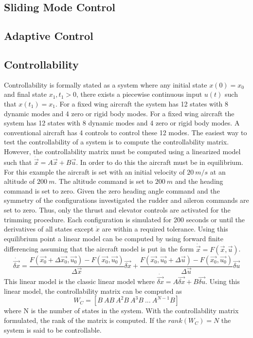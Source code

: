 \subsection{Sliding Mode Control}

\subsection{Adaptive Control}

\subsection{Controllability}

Controllability is formally stated as a system where any initial
state $x(0)=x_0$ and final state $x_1,t_1>0$, there exists a piecewise
continuous input $u(t)$ such that $x(t_1)=x_1$. 
For a fixed wing aircraft the system has 12 states with 8 dynamic
modes and 4 zero or rigid body modes. For a fixed wing aircraft the system has 12 states with 8 dynamic
modes and 4 zero or rigid body modes. A conventional aircraft has 4
controls to control these 12 modes. The easiest way to test the 
controllability of a system  is to compute the
controllability matrix. However, the controllability matrix must be
computed using a linearized model such that
$\dot{\vec{x}}=A\vec{x}+B\vec{u}$. In order to do this the aircraft
must be in equilibrium. For this example the aircraft is
set with an initial velocity of $20~m/s$ at an altitude of
$200~m$. The altitude command is set to $200~m$ and the heading
command is set to zero. Given the zero heading angle command and the
symmetry of the configurations investigated the rudder and aileron
commands are set to zero. Thus, only the thrust and elevator controls
are activated for the trimming procedure. Each configuration is
simulated for 200 seconds or until the derivatives of all states
except $\dot{x}$ are within a required tolerance. Using this
equilibrium point a linear model can be computed by using forward
finite differencing assuming that the
aircraft model is put in the form $\dot{\vec{x}} = F(\vec{x},\vec{u})$.
\begin{equation}
\dot{\vec{\delta x}} = \frac{F(\vec{x_0}+\Delta \vec{x_0},\vec{u_0})-F(\vec{x_0},\vec{u_0})}{\Delta
  \vec{x}}\vec{\delta x} + \frac{F(\vec{x_0},\vec{u_0}+\Delta
  \vec{u})-F(\vec{x_0},\vec{u_0})}{\Delta \vec{u}}\vec{\delta u}
\end{equation}
This linear model is the classic linear model where
$\dot{\vec{\delta x}}=A\vec{\delta{x}}+B\vec{\delta{u}}$. Using this linear model, the
controllability matrix can be computed as
\begin{equation}
W_C = [B~AB~A^2B~A^3B~...~A^{N-1}B]
\end{equation}
where N is the number of states in the system. With the controllability
matrix formulated, the rank of the matrix is computed. If the
$rank(W_C)=N$ the system is said to be controllable.

